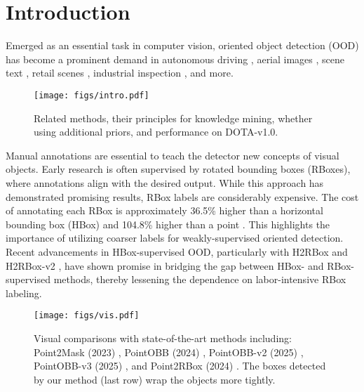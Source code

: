 \vspace{-6pt}
\section{Introduction}
\label{sec:intro}

Emerged as an essential task in computer vision, oriented object detection (OOD) has become a prominent demand in autonomous driving \cite{feng2021deep}, aerial images \cite{xia2018dota, liu2017hrsc, yang2018automatic, yang2022arbitrary, fu2020rotation}, scene text \cite{liao2018rotation, liu2018fots, zhou2017east}, retail scenes \cite{goldman2019precise, pan2020dynamic}, industrial inspection \cite{liu2020data, wu2022pcbnet}, and more.

\begin{figure}[t!]
\setlength{\abovecaptionskip}{1.2mm}
\centering
\texttt{[image: figs/intro.pdf]}
\caption{Related methods, their principles for knowledge mining, whether using additional priors, and performance on DOTA-v1.0.}
\label{fig:intro}
\vspace{-6pt}
\end{figure}

Manual annotations are essential to teach the detector new concepts of visual objects. Early research is often supervised by rotated bounding boxes (RBoxes), where annotations align with the desired output. While this approach has demonstrated promising results, RBox labels are considerably expensive. The cost of annotating each RBox is approximately 36.5\% higher than a horizontal bounding box (HBox) and 104.8\% higher than a point \cite{yu2024point2rbox}. This highlights the importance of utilizing coarser labels for weakly-supervised oriented detection. Recent advancements in HBox-supervised OOD, particularly with H2RBox \cite{yang2023h2rbox} and H2RBox-v2 \cite{yu2023h2rboxv2}, have shown promise in bridging the gap between HBox- and RBox-supervised methods, thereby lessening the dependence on labor-intensive RBox labeling. 

\begin{figure*}[t!]
\setlength{\abovecaptionskip}{1.2mm}
\centering
\texttt{[image: figs/vis.pdf]}
\caption{Visual comparisons with state-of-the-art methods including: Point2Mask (2023) \cite{li2023point2mask}, PointOBB (2024) \cite{luo2024pointobb}, PointOBB-v2 (2025) \cite{ren2024pointobbv2}, PointOBB-v3 (2025) \cite{zhang2025pointobbv3}, and Point2RBox (2024) \cite{yu2024point2rbox}. The boxes detected by our method (last row) wrap the objects more tightly.}
\label{fig:vis}
\vspace{-6pt}
\end{figure*}

